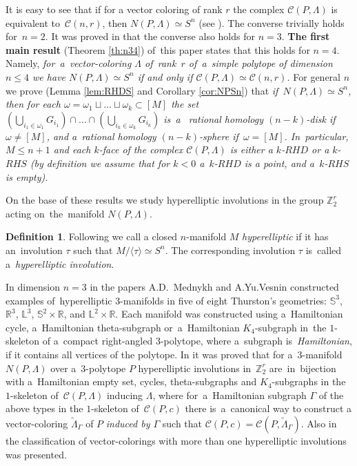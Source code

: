 \documentclass[12pt]{amsart}
\theoremstyle{definition}
\newtheorem{definition}[formula]{Definition}
\theoremstyle{remark}
\begin{document}
It is easy to see that if for a vector coloring of rank $r$ the complex $\mathcal{C}(P,\Lambda)$ 
is equivalent to~$\mathcal{C}(n,r)$, then $N(P,\Lambda)\simeq S^n$  (see  \cite[Construction 5.8]{E24}). 
The converse trivially holds for~$n=2$. It was proved in \cite[Theorem 10.1]{E24} that the converse 
also holds for $n=3$. {\bf The first main result} (Theorem \ref{th:n34}) of~this paper states that this holds for $n=4$. 
Namely, {\it for~a~vector-coloring $\Lambda$ of~rank~$r$ of~a~simple polytope of dimension $n\leqslant 4$ we have 
$N(P,\Lambda)\simeq S^n$ if and only if $\mathcal{C}(P,\Lambda)\simeq \mathcal{C}(n,r)$.} For general $n$
we prove (Lemma \ref{lem:RHDS} and Corollary \ref{cor:NPSn}) that {\it if~$N(P,\Lambda)\simeq S^n$, then for 
each $\omega=\omega_1\sqcup \dots\sqcup\omega_k\subset[M]$ 
the set $\left(\bigcup\limits_{i_1\in \omega_1} G_{i_1}\right)\cap\dots
\cap \left(\bigcup\limits_{i_k\in \omega_k} G_{i_k}\right)$ is~a~ rational homology $(n-k)$-disk if~$\omega\ne[M]$, and
a~rational homology $(n-k)$-sphere if~$\omega=[M]$. 
In~particular,  $M\leqslant n+1$ and each $k$-face of the complex $\mathcal{C}(P,\Lambda)$
is either a $k$-$RHD$ or a $k$-$RHS$ (by definition we assume that for $k<0$
a~$k$-$RHD$ is a point, and a~$k$-$RHS$ is empty).}

On the base of these results we study hyperelliptic involutions in the group $\mathbb Z_2^r$ acting 
on~the~manifold $N(P,\Lambda)$.
\begin{definition}
Following \cite{VM99S1} we call a closed $n$-manifold $M$ {\it hyperelliptic} if it has an~involution $\tau$ such that
$M/\langle\tau\rangle\simeq S^n$. The corresponding involution $\tau$ is~called a~{\it hyperelliptic involution}.
\end{definition}
 
In dimension $n=3$ in the papers \cite{M90, VM99M, VM99S2} A.D.~Mednykh and A.Yu.Vesnin
constructed examples of~hyperelliptic $3$-manifolds
in five of eight Thurston's geometries: $\mathbb S^3$, $\mathbb R^3$, $\mathbb L^3$, $\mathbb S^2\times\mathbb R$, and 
$\mathbb L^2\times\mathbb R$. Each manifold was constructed using a~Hamiltonian cycle, a~Hamiltonian theta-subgraph
or~a~Hamiltonian $K_4$-subgraph in~the $1$-skeleton of a~compact 
right-angled $3$-polytope, where a~subgraph is~{\it Hamiltonian},
if it contains all vertices of the polytope. In \cite[Theorem 11.5]{E24} it was proved that for a~$3$-manifold $N(P,\Lambda)$
over a~$3$-polytope $P$ hyperelliptic involutions in~$\mathbb Z_2^r$ are~in~bijection with 
a~Hamiltonian empty set, cycles, theta-subgraphs and $K_4$-subgraphs in the $1$-skeleton 
of~$\mathcal{C}(P,\Lambda)$ inducing $\Lambda$, where 
for~a~Hamiltonian subgraph $\Gamma$ of the above types in the $1$-skeleton of~$\mathcal{C}(P,c)$
there is~a~canonical way to construct a vector-coloring $\widetilde{\Lambda}_{\Gamma}$ of $P$
{\it induced by $\Gamma$} such that $\mathcal{C}(P,c)=\mathcal{C}(P,\widetilde{\Lambda}_{\Gamma})$. 
Also in \cite[Theorem 11.7]{E24} the classification of vector-colorings with 
more than one hyperelliptic involutions was presented. 
\end{document}
